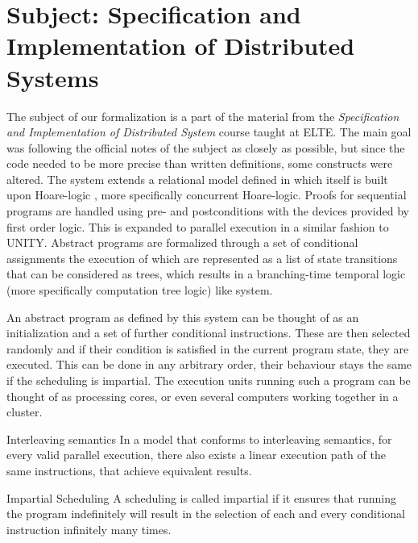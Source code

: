 \section{Subject: Specification and Implementation of Distributed Systems}
\label{sec:subject}

The subject of our formalization is a part of the material from the \textit{Specification and Implementation of Distributed System} course taught at ELTE. The main goal was following the official notes of the subject\cite{hz-orsi} as closely as possible, but since the code needed to be more precise than written definitions, some constructs were altered. The system extends a relational model defined in \cite{fothi-prog} which itself is built upon Hoare-logic \cite{hoare1978proof}\cite{hoare-logic}, more specifically concurrent Hoare-logic\cite{Lamport1980}. Proofs for sequential programs are handled using pre- and postconditions with the devices provided by first order logic. This is expanded to parallel execution in a similar fashion to UNITY. Abstract programs are formalized through a set of conditional assignments the execution of which are represented as a list of state transitions that can be considered as trees, which results in a branching-time temporal logic \cite{emerson1988branching} (more specifically computation tree logic) like system.

An abstract program as defined by this system can be thought of as an initialization and a set of further conditional instructions. These are then selected randomly and if their condition is satisfied in the current program state, they are executed. This can be done in any arbitrary order, their behaviour stays the same if the scheduling is impartial. The execution units running such a program can be thought of as processing cores, or even several computers working together in a cluster.

\begin{definition}{Interleaving semantics}
\label{def:interleaving-semantics}
In a model that conforms to interleaving semantics, for every valid parallel execution, there also exists a linear execution path of the same instructions, that achieve equivalent results.
\end{definition}

\begin{definition}{Impartial Scheduling}
\label{def:impartial-scheduling}
A scheduling is called impartial if it ensures that running the program indefinitely will result in the selection of each and every conditional instruction infinitely many times.
\end{definition}

